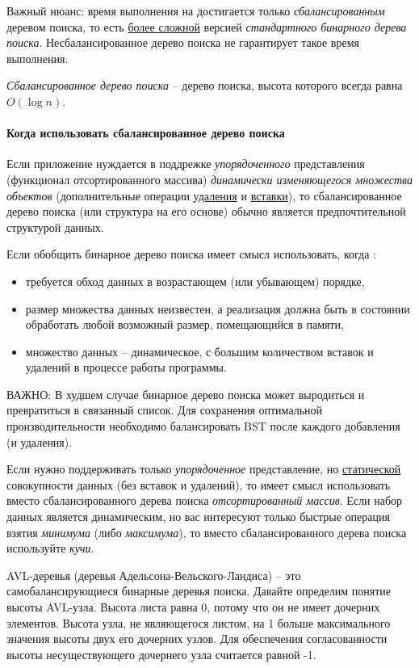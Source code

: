 \documentclass[%
	11pt,
	a4paper,
	utf8,
		]{article}
\begin{document}
Важный нюанс: время выполнения на  достигается только \emph{сбалансированным} деревом поиска, то есть \underline{более сложной} версией \emph{стандартного бинарного дерева поиска}. Несбалансированное дерево поиска не гарантирует такое время выполнения.

\emph{Сбалансированное дерево поиска} -- дерево поиска, высота которого всегда равна $ O(\log n) $.

\paragraph{Когда использовать сбалансированное дерево поиска} Если приложение нуждается в поддрежке \emph{упорядоченного} представления (функционал отсортированного массива) \emph{динамически изменяющегося множества объектов} (дополнительные операции \underline{удаления} и \underline{вставки}), то сбалансированное дерево поиска (или структура на его основе) обычно является предпочтительной структурой данных.

Если обобщить бинарное дерево поиска имеет смысл использовать, когда \cite[]{heineman:2017}:
\begin{itemize}
	\item требуется обход данных в возрастающем (или убывающем) порядке,
	
	\item размер множества данных неизвестен, а реализация должна быть в состоянии обработать любой возможный размер, помещающийся в памяти,
	
	\item множество данных -- динамическое, с большим количеством вставок и удалений в процессе работы программы.
\end{itemize}

ВАЖНО: В худшем случае бинарное дерево поиска может выродиться и превратиться в связанный список. Для сохранения оптимальной производительности необходимо балансировать BST после каждого добавления (и удаления).

Если нужно поддерживать только \emph{упорядоченное} представление, но \underline{статической} совокупности данных (без вставок и удалений), то имеет смысл использовать вместо сбалансированного дерева поиска \emph{отсортированный массив}. Если набор данных является динамическим, но вас интересуют только быстрые операция взятия \emph{минимума} (либо \emph{максимума}), то вместо сбалансированного дерева поиска используйте \emph{кучи}. 

AVL-деревья (деревья Адельсона-Вельского-Ландиса) -- это самобалансирующиеся бинарные деревья поиска. Давайте определим понятие высоты AVL-узла. Высота листа равна 0, потому что он не имеет дочерних элементов. Высота узла, не являющегося листом, на 1 больше максимального значения высоты двух его дочерних узлов. Для обеспечения согласованности высоты несуществующего дочернего узла считается равной -1.
\end{document}

